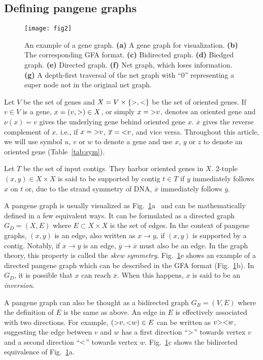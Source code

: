 \documentclass[webpdf,contemporary,large,namedate]{oup-authoring-template}%
\begin{document}
\subsection{Defining pangene graphs}

\begin{figure}[t!]
\centering
\texttt{[image: fig2]}
\caption{An example of a gene graph. {\bf (a)} A gene graph for visualization.
{\bf (b)} The corresponding GFA format.
{\bf (c)} Bidirected graph.
{\bf (d)} Biedged graph.
{\bf (e)} Directed graph.
{\bf (f)} Net graph, which loses information.
{\bf (g)} A depth-first traversal of the net graph with ``0'' representing a super node
not in the original net graph.}\label{fig:exa1}
\end{figure}

Let $V$ be the set of genes
and $X=V\times\{{\rm >},{\rm <}\}$ be the set of oriented genes.
If $v\in V$ is a gene, $x=(v,{\rm >})\in X$, or simply $x={\rm >}v$, denotes an oriented gene
and $\nu(x)=v$ gives the underlying gene behind oriented gene $x$.
$\overline{x}$ gives the reverse complement of $x$.
i.e., if $x={\rm >}v$, $\overline{x}={\rm <}v$, and vice versa.
Throughout this article, we will use symbol $u$, $v$ or $w$ to denote a gene
and use $x$, $y$ or $z$ to denote an oriented gene (Table~\ref{tab:sym}).

Let $T$ be the set of input contigs.
They harbor oriented genes in $X$.
2-tuple $(x,y)\in X\times X$ is said to be supported by contig $t\in T$
if $y$ immediately follows $x$ on $t$ or, due to the strand symmetry of DNA, $\overline{x}$ immediately follows $\overline{y}$.

A pangene graph is usually visualized as Fig.~\ref{fig:exa1}a~\citep{Wick:2015qf}
and can be mathematically defined in a few equivalent ways.
It can be formulated as a directed graph $G_D=(X,E)$ where $E\subset X\times X$ is the set of edges.
In the context of pangene graphs, $(x,y)$ is an edge, also written as $x\to y$, if $(x,y)$ is supported by a contig.
Notably, if $x\to y$ is an edge, $\overline{y}\to\overline{x}$ must also be an edge.
In the graph theory, this property is called the \emph{skew symmetry}.
Fig.~\ref{fig:exa1}e shows an example of a directed pangene graph
which can be described in the GFA format (Fig.~\ref{fig:exa1}b).
In $G_D$, it is possible that $x$ can reach $\overline{x}$.
When this happens, $x$ is said to be an \emph{inversion}.

A pangene graph can also be thought as a bidirected graph $G_B=(V,E)$ where the definition of $E$ is the same as above.
An edge in $E$ is effectively associated with two directions.
For example, $({\rm >}v,{\rm <}w)\in E$ can be written as $v{\rm ><}w$,
suggesting the edge between $v$ and $w$ has a first direction ``${\rm >}$'' towards vertex $v$ and a second direction ``${\rm <}$'' towards vertex $w$.
Fig.~\ref{fig:exa1}c shows the bidirected equivalence of Fig.~\ref{fig:exa1}a.
\end{document}
